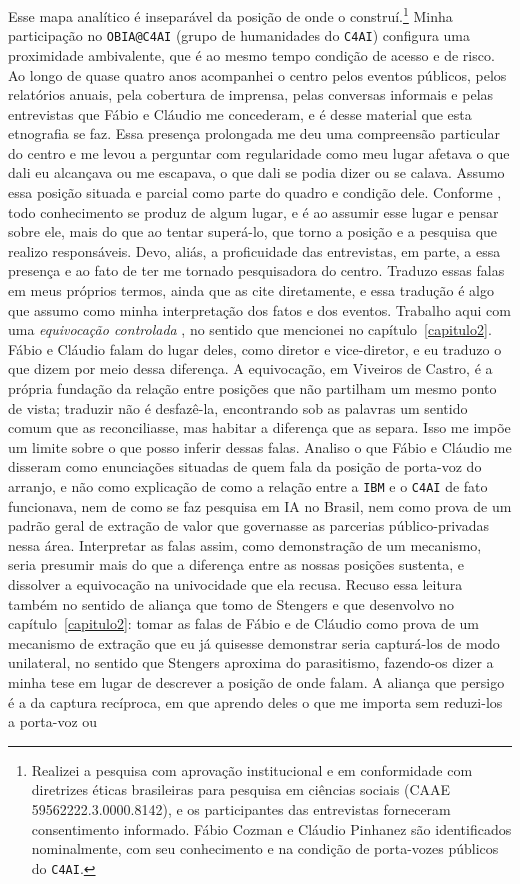 Esse mapa analítico é inseparável da posição de onde o construí.\footnote{Realizei a pesquisa com aprovação institucional e em conformidade com diretrizes éticas brasileiras para pesquisa em ciências sociais (CAAE 59562222.3.0000.8142), e os participantes das entrevistas forneceram consentimento informado. Fábio Cozman e Cláudio Pinhanez são identificados nominalmente, com seu conhecimento e na condição de porta-vozes públicos do \texttt{C4AI}.} Minha participação no \texttt{OBIA@C4AI} (grupo de humanidades do \texttt{C4AI}) configura uma proximidade ambivalente, que é ao mesmo tempo condição de acesso e de risco. Ao longo de quase quatro anos acompanhei o centro pelos eventos públicos, pelos relatórios anuais, pela cobertura de imprensa, pelas conversas informais e pelas entrevistas que Fábio e Cláudio me concederam, e é desse material que esta etnografia se faz. Essa presença prolongada me deu uma compreensão particular do centro e me levou a perguntar com regularidade como meu lugar afetava o que dali eu alcançava ou me escapava, o que dali se podia dizer ou se calava. Assumo essa posição situada e parcial como parte do quadro e condição dele. Conforme \textcite{Haraway1991Situated}, todo conhecimento se produz de algum lugar, e é ao assumir esse lugar e pensar sobre ele, mais do que ao tentar superá-lo, que torno a posição e a pesquisa que realizo responsáveis. Devo, aliás, a proficuidade das entrevistas, em parte, a essa presença e ao fato de ter me tornado pesquisadora do centro. Traduzo essas falas em meus próprios termos, ainda que as cite diretamente, e essa tradução é algo que assumo como minha interpretação dos fatos e dos eventos. Trabalho aqui com uma \textit{equivocação controlada} \parencite{ViveirosdeCastro2018Equivocacao}, no sentido que mencionei no capítulo~\ref{capitulo2}. Fábio e Cláudio falam do lugar deles, como diretor e vice-diretor, e eu traduzo o que dizem por meio dessa diferença. A equivocação, em Viveiros de Castro, é a própria fundação da relação entre posições que não partilham um mesmo ponto de vista; traduzir não é desfazê-la, encontrando sob as palavras um sentido comum que as reconciliasse, mas habitar a diferença que as separa. Isso me impõe um limite sobre o que posso inferir dessas falas. Analiso o que Fábio e Cláudio me disseram como enunciações situadas de quem fala da posição de porta-voz do arranjo, e não como explicação de como a relação entre a \texttt{IBM} e o \texttt{C4AI} de fato funcionava, nem de como se faz pesquisa em IA no Brasil, nem como prova de um padrão geral de extração de valor que governasse as parcerias público-privadas nessa área. Interpretar as falas assim, como demonstração de um mecanismo, seria presumir mais do que a diferença entre as nossas posições sustenta, e dissolver a equivocação na univocidade que ela recusa. Recuso essa leitura também no sentido de aliança que tomo de Stengers e que desenvolvo no capítulo~\ref{capitulo2}: tomar as falas de Fábio e de Cláudio como prova de um mecanismo de extração que eu já quisesse demonstrar seria capturá-los de modo unilateral, no sentido que Stengers aproxima do parasitismo, fazendo-os dizer a minha tese em lugar de descrever a posição de onde falam. A aliança que persigo é a da captura recíproca, em que aprendo deles o que me importa sem reduzi-los a porta-voz ou 